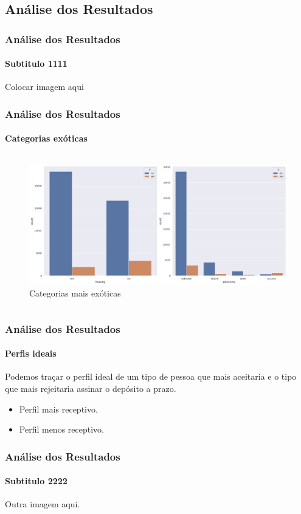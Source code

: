 \documentclass{beamer}
\begin{document}
\begin{frame}
\section{Análise dos Resultados}
\frametitle{Análise dos Resultados}   
\framesubtitle{Subtitulo 1111}
	Colocar imagem aqui    
\end{frame}

\begin{frame}
	\frametitle{Análise dos Resultados}
	\framesubtitle{Categorias exóticas}
	\begin{columns}
		\begin{column}{1\textwidth}
			\begin{figure}[H]
				\centerline{\includegraphics[width=1.0\textwidth]{IMGS/analise1.png}}
				
				\caption{\label{fig:analise1}Categorias mais exóticas}
			\end{figure}
		\end{column}
	\end{columns}    
\end{frame}

\begin{frame}
	\frametitle{Análise dos Resultados}
	\framesubtitle{Perfis ideais}
	Podemos traçar o perfil ideal de um tipo de pessoa que mais aceitaria e o tipo que mais rejeitaria assinar o depósito a prazo. \linebreak
	\begin{itemize}
		\item Perfil mais receptivo. \linebreak
		\item Perfil menos receptivo.
	\end{itemize}
\end{frame}

\begin{frame}
	\frametitle{Análise dos Resultados}
	\framesubtitle{Subtitulo 2222}
	Outra imagem aqui.
\end{frame}
\end{document}
